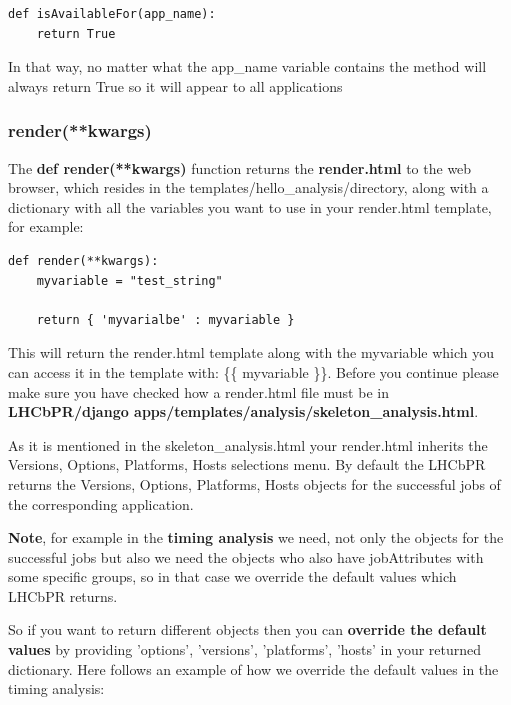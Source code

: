 \documentclass{lhcbnote}
\begin{document}
\begin{verbatim}
def isAvailableFor(app_name):
    return True
\end{verbatim}

In that way, no matter what the app\_name variable contains the method will always return True so it will appear to all applications

\subsubsection{render(**kwargs)}

The {\bf def render(**kwargs) } function returns the {\bf render.html} to the web browser, which resides in the templates/hello\_analysis/directory,
along with a dictionary with all the variables you want to use in your render.html template, 
for example:

\vspace{2 mm}

\begin{verbatim}
def render(**kwargs):
    myvariable = "test_string"

    return { 'myvarialbe' : myvariable }
\end{verbatim}

\vspace{2 mm}

This will return the render.html template along with the myvariable which you can access it in the template with: \{\{ myvariable \}\}. 
Before you continue please make sure you have checked how a render.html file must be in {\bf LHCbPR/django apps/templates/analysis/skeleton\_analysis.html}.

As it is mentioned in the skeleton\_analysis.html your render.html inherits the Versions, Options, Platforms, Hosts selections menu.
By default the LHCbPR returns the Versions, Options, Platforms, Hosts objects for the successful jobs of the corresponding application.

\vspace{2 mm}

{\bf Note}, for example in the {\bf timing analysis} we need, not only the objects for the successful jobs but also we need the objects who also have jobAttributes with some specific groups, so in that
case we override the default values which LHCbPR returns.

So if you want to return different objects then you can {\bf override the default values} by providing 'options', 'versions', 'platforms', 'hosts' in your returned dictionary. Here follows an example of how we override the default values in the timing analysis:
\end{document}
